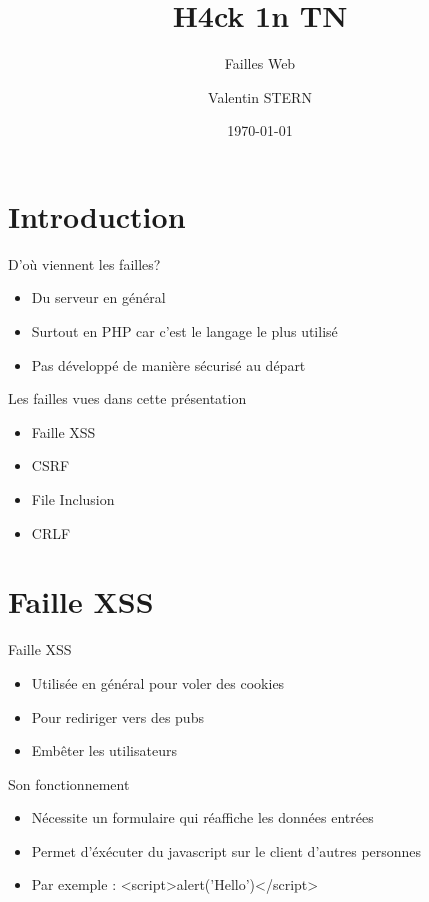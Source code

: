 \documentclass{beamer}
\title[Failles Web]{H4ck 1n TN}
\subtitle{Failles Web}
\author[H4ck1nTN]{Valentin STERN}
\institute[HiT]{Ceten -- TELECOM Nancy}
\date{\today}
\begin{document}
\begin{frame}
\titlepage
\end{frame}

\section{Introduction}

\begin{frame}{D'où viennent les failles?}
	\begin{itemize}
		\item Du serveur en général
		\item Surtout en PHP car c'est le langage le plus utilisé
		\item Pas développé de manière sécurisé au départ
	\end{itemize}
\end{frame}

\begin{frame}{Les failles vues dans cette présentation}
	\begin{itemize}
		\item Faille XSS
		\item CSRF
		\item File Inclusion
		\item CRLF
	\end{itemize}
\end{frame}

\section{Faille XSS}

\begin{frame}{Faille XSS}
	\begin{itemize}
		\item Utilisée en général pour voler des cookies
		\item Pour rediriger vers des pubs
		\item Embêter les utilisateurs
	\end{itemize}
\end{frame}

\begin{frame}{Son fonctionnement}
	\begin{itemize}
		\item Nécessite un formulaire qui réaffiche les données entrées
		\item Permet d'éxécuter du javascript sur le client d'autres personnes
		\item Par exemple : <script>alert('Hello')</script>
	\end{itemize}
\end{frame}
\end{document}
